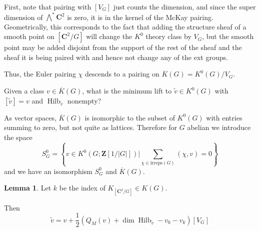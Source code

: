 \documentclass{amsart}[12pt]
\theoremstyle{definition}
\newtheorem{lemma}[dummy]{Lemma}
\newcommand{\Z}{\mathbf{Z}}
\newcommand{\C}{\mathbf{C}}
\newcommand{\irreps}{\text{irreps}}
\DeclareMathOperator{\Hilb}{Hilb}
\begin{document}
First, note that pairing with $[V_G]$ just counts the dimension, and since the super dimension of $\bigwedge^*\C^2$ is zero, it is in the kernel of the McKay pairing.  Geometrically, this corresponds to the fact that adding the structure sheaf of a smooth point on $[\C^2/G]$ will change the $K^0$ theory class by $V_G$, but the smooth point may be added disjoint from the support of the rest of the sheaf and the sheaf it is being paired with and hence not change any of the ext groups.


Thus, the Euler pairing $\chi$ descends to a pairing on $\overline{K}(G)=K^0(G)/V_G$.

Given a class $v\in \overline{K}(G)$, what is the minimum lift to $\tilde{v}\in K^0(G)$ with $[\tilde{v}]=v$ and $\Hilb_{\tilde{v}}$ nonempty?

As vector spaces, $\overline{K}(G)$ is isomorphic to the subset of $K^0(G)$ with entries summing to zero, but not quite as lattices.  Therefore for $G$ abelian we introduce the space 
$$S^0_G=\left\{v\in K^0(G; \Z[1/|G|])\Bigg | \sum_{\chi\in\irreps(G)}(\chi, v)=0\right\}$$
and we have an isomorphism $S^0_G$ and $\overline{K}(G)$.  


\begin{lemma}
Let $k$ be the index of $K_{[\C^2/G]}\in K(G)$.

Then
$$\tilde{v}=v+\frac{1}{2}\left(Q_M(v)+\dim\Hilb_{\tilde{v}} -v_0-v_{k}\right)[V_G]$$
\end{lemma}
\end{document}
